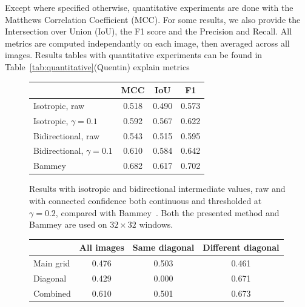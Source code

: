 \documentclass{ipol}
\newcommand{\qb}[1]{\textcolor{c1}{(Quentin) #1}}
\begin{document}
Except where specified otherwise, quantitative experiments are done with the Matthews Correlation Coefficient (MCC). For some results, we also provide the Intersection over Union (IoU), the F1 score and the Precision and Recall. All metrics are computed independantly on each image, then averaged across all images. Results tables with quantitative experiments can be found in Table~\ref{tab:quantitative}\qb{explain metrics}
\begin{table}[ht]
    \centering
        \begin{subfigure}[b]{.48\linewidth}
                \centering
            \begin{tabular}{lccc}
                    \toprule
                    &MCC&IoU&F1\\
                    \midrule
                    \scriptsize Isotropic, raw&0.518&0.490&0.573\\
                    \scriptsize Isotropic, $\gamma=0.1$&0.592&0.567&0.622\\
                    \scriptsize Bidirectional, raw&0.543&0.515&0.595\\
                    \scriptsize Bidirectional, $\gamma=0.1$&0.610&0.584&0.642\\
                    \cmidrule{1-1}
                    Bammey~\cite{bammey20}&0.682&0.617&0.702\\
                   \bottomrule
            \end{tabular}
                \caption{Results with isotropic and bidirectional intermediate values, raw and with connected confidence both continuous and thresholded at $\gamma=0.2$, compared with Bammey~\cite{bammey20}. Both the presented method and Bammey are used on $32\times32$ windows.}
        \end{subfigure}\hfill%
        \begin{subfigure}[b]{.48\linewidth}
                \centering
                \begin{tabular}{lccc}
                        \toprule
                        &\scriptsize All images &\scriptsize  Same diagonal &\scriptsize  Different diagonal\\
                        \midrule
                        \scriptsize Main grid & 0.476 & 0.503 & 0.461\\
                        \scriptsize Diagonal & 0.429 & 0.000 & 0.671\\
                        \scriptsize Combined & 0.610 & 0.501 & 0.673\\
                        \bottomrule

\end{tabular}
\end{subfigure}
\end{table}
\end{document}
